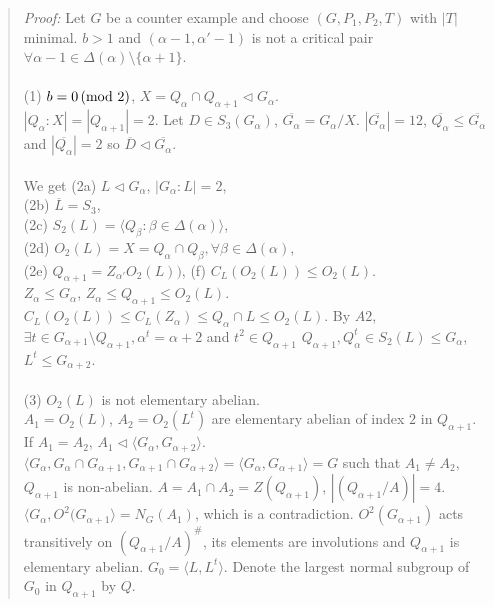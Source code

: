 \begin{quote}
\emph{Proof:}  
Let $G$ be a counter example and choose $(G, P_1, P_2, T)$ with $|T|$ minimal.
$b > 1$ and $(\alpha - 1, \alpha' - 1)$ is not a critical pair $\forall \alpha - 1 \in \Delta(\alpha) \setminus \{\alpha + 1 \}$.
\\
\\
(1) $b = 0 \thinspace \textnormal{(mod } 2 \textnormal{)}$, $X = Q_{\alpha} \cap Q_{\alpha + 1} \lhd G_{\alpha}$.
\\
$|Q_{\alpha} : X| = |Q_{\alpha + 1}| = 2$.  Let $D \in S_3(G_{\alpha})$, ${\overline {G_{\alpha}}} = G_{\alpha} / X$.
$|{\overline {G_{\alpha}}}|= 12$, ${\overline {Q_{\alpha}}} \leq {\overline {G_{\alpha}}}$ and $|{\overline {Q_{\alpha}}}|=2$ so
${\overline D} \lhd {\overline {G_{\alpha}}}$.\\
\\
We get (2a) $L \lhd G_{\alpha}$, $|G_{\alpha}:L| = 2$,\\
(2b) ${\overline L} = S_3$, \\
(2c) $S_2(L) = \langle Q_{\beta}: \beta \in \Delta(\alpha)\rangle$,\\
(2d) $O_2(L) = X = Q_{\alpha} \cap Q_{\beta}, \forall \beta \in \Delta(\alpha)$,\\
(2e) $Q_{\alpha +1} = Z_{\alpha'} O_2(L))$, (f) $C_L(O_2(L)) \leq O_2(L)$.\\
$Z_{\alpha} \leq G_{\alpha}$, $Z_{\alpha} \leq Q_{\alpha + 1} \leq O_2(L)$.
$C_L(O_2(L)) \leq C_L(Z_{\alpha}) \leq Q_{\alpha} \cap L \leq O_2(L)$.
By $A2$, $\exists t \in G_{\alpha + 1} \setminus Q_{\alpha + 1}, \alpha^t = \alpha + 2$ and $t^2 \in Q_{\alpha + 1}$
$Q_{\alpha + 1}, Q_{\alpha}^t \in S_2(L) \leq G_{\alpha}$, $L^t \leq G_{\alpha + 2}$. \\
\\
(3) $O_2(L)$ is not elementary abelian.
\\
$A_1 = O_2(L)$, $A_2=O_2(L^t)$ are elementary abelian of index $2$ in $Q_{\alpha + 1}$.
If $A_1 = A_2$, $A_1 \lhd \langle G_{\alpha}, G_{\alpha + 2}\rangle$.
$\langle G_{\alpha}, G_{\alpha} \cap  G_{\alpha + 1}, G_{\alpha + 1} \cap  G_{\alpha + 2}\rangle = \langle G_{\alpha}, G_{\alpha + 1}\rangle=G$
such that $A_1 \ne A_2$, $Q_{\alpha + 1}$ is non-abelian.
$A = A_1 \cap A_2 = Z(Q_{\alpha + 1})$, $|(Q_{\alpha + 1}/A)| = 4$.
$\langle G_{\alpha}, O^2(G_{\alpha + 1} \rangle = N_G(A_1)$, which is a contradiction.
$O^2(G_{\alpha + 1})$ acts transitively on $(Q_{\alpha + 1}/A)^{\#}$, its elements are involutions and $Q_{\alpha + 1}$ is elementary
abelian.
$G_0 = \langle L, L^t \rangle$.  Denote the largest normal subgroup of $G_0$ in $Q_{\alpha +1}$ by $Q$.

\end{quote}
